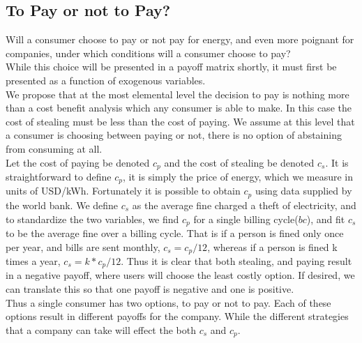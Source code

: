\documentclass{article}
\begin{document}
\subsection{To Pay or not to Pay?}
Will a consumer choose to pay or not pay for energy, and even more poignant for companies, under which conditions will a consumer choose to pay?\\
While this choice will be presented in a payoff matrix shortly, it must first be presented as a function of exogenous variables.\\
We propose that at the most elemental level the decision to pay is nothing more than a cost benefit analysis which any consumer is able to make. In this case the cost of stealing must be less than the cost of paying. We assume at this level that a consumer is choosing between paying or not, there is no option of abstaining from consuming at all.\\
Let the cost of paying be denoted $c_p$ and the cost of stealing be denoted $c_s$. It is straightforward to define $c_p$, it is simply the price of energy, which we measure in units of USD/kWh. Fortunately it is possible to obtain $c_p$ using data supplied by the world bank. We define $c_s$ as the average fine charged a theft of electricity, and to standardize the two variables, we find $c_p$ for a single billing cycle($bc$), and fit $c_s$ to be the average fine over a billing cycle. That is if a person is fined only once per year, and bills are sent monthly, $c_s = c_p/12$, whereas if a person is fined k times a year, $c_s = k*c_p/12$. Thus it is clear that both stealing, and paying result in a negative payoff, where users will choose the least costly option. If desired, we can translate this so that one payoff is negative and one is positive. \\
Thus a single consumer has two options, to pay or not to pay. Each of these options result in different payoffs for the company. While the different strategies that a company can take will effect the both $c_s$ and $c_p$. 
\end{document}
